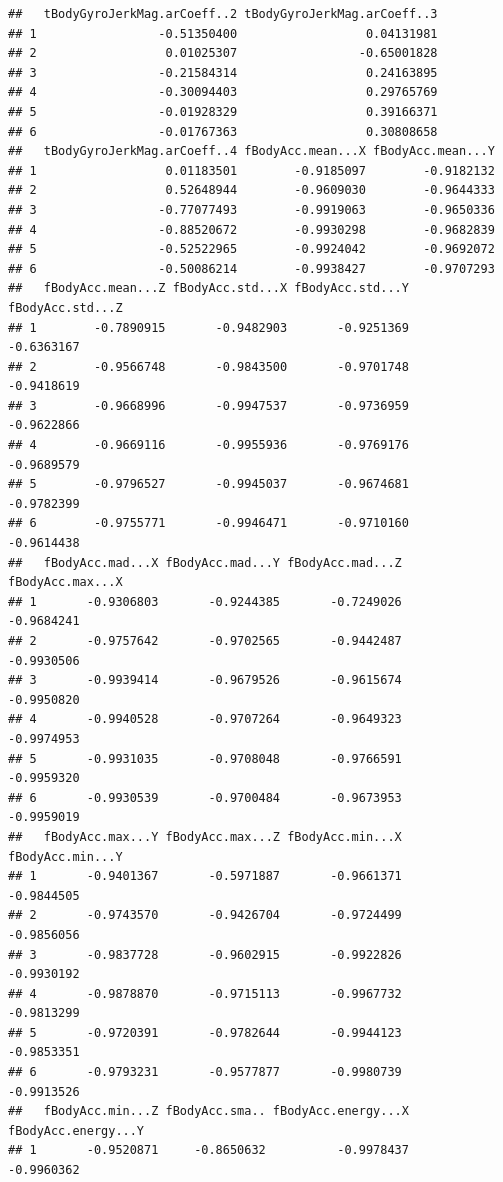 \documentclass[
]{article}
\begin{document}
\begin{verbatim}
##   tBodyGyroJerkMag.arCoeff..2 tBodyGyroJerkMag.arCoeff..3
## 1                 -0.51350400                  0.04131981
## 2                  0.01025307                 -0.65001828
## 3                 -0.21584314                  0.24163895
## 4                 -0.30094403                  0.29765769
## 5                 -0.01928329                  0.39166371
## 6                 -0.01767363                  0.30808658
##   tBodyGyroJerkMag.arCoeff..4 fBodyAcc.mean...X fBodyAcc.mean...Y
## 1                  0.01183501        -0.9185097        -0.9182132
## 2                  0.52648944        -0.9609030        -0.9644333
## 3                 -0.77077493        -0.9919063        -0.9650336
## 4                 -0.88520672        -0.9930298        -0.9682839
## 5                 -0.52522965        -0.9924042        -0.9692072
## 6                 -0.50086214        -0.9938427        -0.9707293
##   fBodyAcc.mean...Z fBodyAcc.std...X fBodyAcc.std...Y fBodyAcc.std...Z
## 1        -0.7890915       -0.9482903       -0.9251369       -0.6363167
## 2        -0.9566748       -0.9843500       -0.9701748       -0.9418619
## 3        -0.9668996       -0.9947537       -0.9736959       -0.9622866
## 4        -0.9669116       -0.9955936       -0.9769176       -0.9689579
## 5        -0.9796527       -0.9945037       -0.9674681       -0.9782399
## 6        -0.9755771       -0.9946471       -0.9710160       -0.9614438
##   fBodyAcc.mad...X fBodyAcc.mad...Y fBodyAcc.mad...Z fBodyAcc.max...X
## 1       -0.9306803       -0.9244385       -0.7249026       -0.9684241
## 2       -0.9757642       -0.9702565       -0.9442487       -0.9930506
## 3       -0.9939414       -0.9679526       -0.9615674       -0.9950820
## 4       -0.9940528       -0.9707264       -0.9649323       -0.9974953
## 5       -0.9931035       -0.9708048       -0.9766591       -0.9959320
## 6       -0.9930539       -0.9700484       -0.9673953       -0.9959019
##   fBodyAcc.max...Y fBodyAcc.max...Z fBodyAcc.min...X fBodyAcc.min...Y
## 1       -0.9401367       -0.5971887       -0.9661371       -0.9844505
## 2       -0.9743570       -0.9426704       -0.9724499       -0.9856056
## 3       -0.9837728       -0.9602915       -0.9922826       -0.9930192
## 4       -0.9878870       -0.9715113       -0.9967732       -0.9813299
## 5       -0.9720391       -0.9782644       -0.9944123       -0.9853351
## 6       -0.9793231       -0.9577877       -0.9980739       -0.9913526
##   fBodyAcc.min...Z fBodyAcc.sma.. fBodyAcc.energy...X fBodyAcc.energy...Y
## 1       -0.9520871     -0.8650632          -0.9978437          -0.9960362

\end{verbatim}
\end{document}
